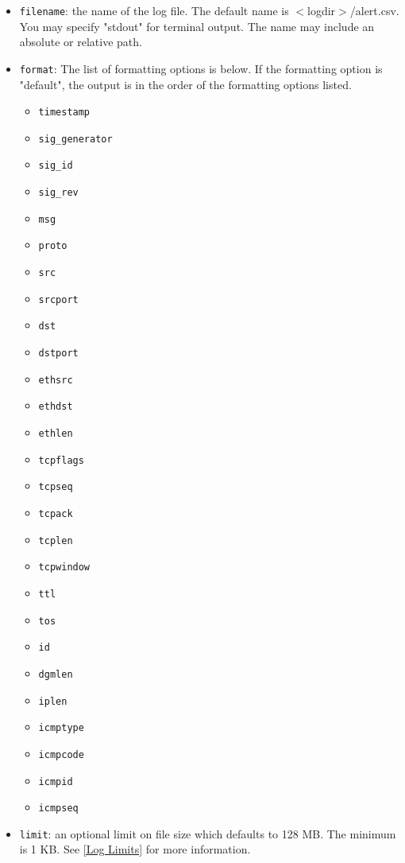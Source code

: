 \documentclass[english]{report}
\begin{document}
\begin{itemize}
\item \texttt{filename}: the name of the log file.  The default name is
$<$logdir$>$/alert.csv.  You may specify "stdout" for terminal output.  The name
may include an absolute or relative path.

\item \texttt{format}: The list of formatting options is below. If the
formatting option is "default", the output is in the order of the formatting
options listed.

\begin{itemize}
\item \texttt{timestamp}
\item \texttt{sig\_generator}
\item \texttt{sig\_id}
\item \texttt{sig\_rev}
\item \texttt{msg}
\item \texttt{proto}
\item \texttt{src}
\item \texttt{srcport}
\item \texttt{dst}
\item \texttt{dstport}
\item \texttt{ethsrc}
\item \texttt{ethdst}
\item \texttt{ethlen}
\item \texttt{tcpflags}
\item \texttt{tcpseq}
\item \texttt{tcpack}
\item \texttt{tcplen}
\item \texttt{tcpwindow}
\item \texttt{ttl}
\item \texttt{tos}
\item \texttt{id}
\item \texttt{dgmlen}
\item \texttt{iplen}
\item \texttt{icmptype}
\item \texttt{icmpcode}
\item \texttt{icmpid}
\item \texttt{icmpseq}
\end{itemize}

\item \texttt{limit}: an optional limit on file size which defaults to 128 MB.  
The minimum is 1 KB.  See \ref{Log Limits} for more information.
\end{itemize}
\end{document}
